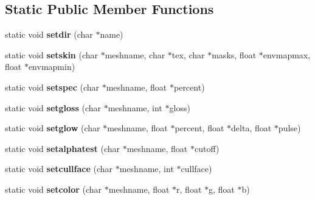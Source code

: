 \subsection*{Static Public Member Functions}
\begin{DoxyCompactItemize}
\item 
\mbox{\label{structmodelcommands_a6c120805aa835332d71c31534f974366}} 
static void {\bfseries setdir} (char $\ast$name)
\item 
\mbox{\label{structmodelcommands_a604377b130f5ed06abeaf6d4f3b943d4}} 
static void {\bfseries setskin} (char $\ast$meshname, char $\ast$tex, char $\ast$masks, float $\ast$envmapmax, float $\ast$envmapmin)
\item 
\mbox{\label{structmodelcommands_aec889e0cb8978ef2a3fb8b9dba08a729}} 
static void {\bfseries setspec} (char $\ast$meshname, float $\ast$percent)
\item 
\mbox{\label{structmodelcommands_a35fb8fb68b35b4eb33c21c19a14a155d}} 
static void {\bfseries setgloss} (char $\ast$meshname, int $\ast$gloss)
\item 
\mbox{\label{structmodelcommands_a58f579223c7aa0ef461bba19b9b0e2a8}} 
static void {\bfseries setglow} (char $\ast$meshname, float $\ast$percent, float $\ast$delta, float $\ast$pulse)
\item 
\mbox{\label{structmodelcommands_ae9f3a4afdb021d1158e6422ac6cf0499}} 
static void {\bfseries setalphatest} (char $\ast$meshname, float $\ast$cutoff)
\item 
\mbox{\label{structmodelcommands_aed8cab88ec25baacf8c1ddeb1fbe7572}} 
static void {\bfseries setcullface} (char $\ast$meshname, int $\ast$cullface)
\item 
\mbox{\label{structmodelcommands_add95b94a2aeff4ebabebdb5437ce656f}} 
static void {\bfseries setcolor} (char $\ast$meshname, float $\ast$r, float $\ast$g, float $\ast$b)
\item 
\mbox{\label{structmodelcommands_aac0022b1cc0f2a4b8b3047c55c7b0906}} 

\end{DoxyCompactItemize}
